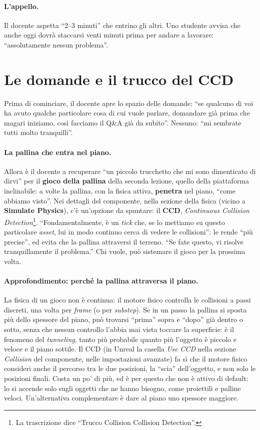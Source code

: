 \paragraph{L'appello.} Il docente aspetta ``2--3 minuti'' che entrino gli altri. Uno
studente avvisa che anche oggi dovrà staccarsi venti minuti prima per andare a
lavorare: ``assolutamente nessun problema''.

\section{Le domande e il trucco del CCD}
\label{ue4:sec:ccd}

Prima di cominciare, il docente apre lo spazio delle domande: ``se qualcuno di voi ha
avuto qualche particolare cosa di cui vuole parlare, domandare già prima che magari
iniziamo, così facciamo il Q\&A già da subito''. Nessuno: ``mi sembrate tutti molto
tranquilli''.

\paragraph{La pallina che entra nel piano.} Allora è il docente a recuperare ``un
piccolo trucchetto che mi sono dimenticato di dirvi'' per il \textbf{gioco della
pallina} della seconda lezione, quello della piattaforma inclinabile: a volte la
pallina, con la fisica attiva, \textbf{penetra} nel piano, ``come abbiamo visto''. Nei
dettagli del componente, nella sezione della fisica (vicino a \textbf{Simulate
Physics}), c'è un'opzione da spuntare: il \textbf{CCD}, \emph{Continuous Collision
Detection}\footnote{La trascrizione dice ``Trucco Collision Collision Detection''.}.
``Fondamentalmente, è un \emph{tick} che, se lo mettiamo su questo particolare
\emph{asset}, lui in modo continuo cerca di vedere le collisioni'': le rende ``più
precise'', ed evita che la pallina attraversi il terreno. ``Se fate questo, vi risolve
tranquillamente il problema.'' Chi vuole, può sistemare il gioco per la prossima volta.

\paragraph{Approfondimento: perché la pallina attraversa il piano.} La fisica di un
gioco non è continua: il motore fisico controlla le collisioni a passi discreti, una
volta per \emph{frame} (o per \emph{substep}). Se in un passo la pallina si sposta più
dello spessore del piano, può trovarsi ``prima'' sopra e ``dopo'' già dentro o sotto,
senza che nessun controllo l'abbia mai vista toccare la superficie: è il fenomeno del
\emph{tunneling}, tanto più probabile quanto più l'oggetto è piccolo e veloce e il piano
sottile. Il CCD (in Unreal la casella \emph{Use CCD} nella sezione \emph{Collision} del
componente, nelle impostazioni avanzate) fa sì che il motore fisico consideri anche il
percorso tra le due posizioni, la ``scia'' dell'oggetto, e non solo le posizioni
finali. Costa un po' di più, ed è per questo che non è attivo di default: lo si accende
solo sugli oggetti che ne hanno bisogno, come proiettili e palline veloci. Un'alternativa
complementare è dare al piano uno spessore maggiore.

